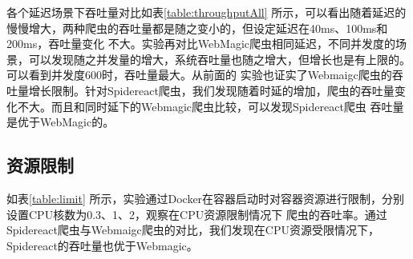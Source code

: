 \documentclass[master]{njuthesis}
\begin{document}

各个延迟场景下吞吐量对比如表\ref{table:throughputAll} 所示，可以看出随着延迟的慢慢增大，两种爬虫的吞吐量都是随之变小的，但设定延迟在40ms、100ms和200ms，吞吐量变化
不大。实验再对比WebMagic爬虫相同延迟，不同并发度的场景，可以发现随之并发量的增大，系统吞吐量也随之增大，但增长也是有上限的。可以看到并发度600时，吞吐量最大。从前面的
实验也证实了Webmaigc爬虫的吞吐量增长限制。针对Spidereact爬虫，我们发现随着时延的增加，爬虫的吞吐量变化不大。而且和同时延下的Webmagic爬虫比较，可以发现Spidereact爬虫
吞吐量是优于WebMagic的。

\subsection{资源限制}
如表\ref{table:limit} 所示，实验通过Docker在容器启动时对容器资源进行限制，分别设置CPU核数为0.3、1、2，观察在CPU资源限制情况下
爬虫的吞吐率。通过Spidereact爬虫与Webmaigc爬虫的对比，我们发现在CPU资源受限情况下，Spidereact的吞吐量也优于Webmagic。
\end{document}

